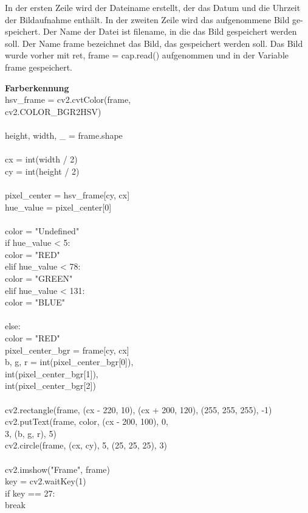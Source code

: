 {In der ersten Zeile wird der Dateiname erstellt, der das Datum und die Uhrzeit der Bildaufnahme enthält. In der zweiten Zeile wird das aufgenommene Bild ge-\\speichert. Der Name der Datei ist \glqq filename\grqq{}, in die das Bild gespeichert werden soll. Der Name \glqq frame\grqq{} bezeichnet das Bild, das gespeichert werden soll. Das Bild wurde vorher mit \glqq ret, frame = cap.read()\grqq{} aufgenommen und in der Variable \glqq frame\grqq{} gespeichert.\\

\newpage

\textbf{Farberkennung}\\

hsv\_frame = cv2.cvtColor(frame,\\ cv2.COLOR\_BGR2HSV)\\
\\
height, width, \_ = frame.shape\\
\\
cx = int(width / 2)\\
cy = int(height / 2)\\
\\
pixel\_center = hsv\_frame[cy, cx]\\
hue\_value = pixel\_center[0]\\
\\
color = "Undefined"\\
if hue\_value < 5:\\
color = "RED"\\
elif hue\_value < 78:\\
color = "GREEN"\\
elif hue\_value < 131:\\
color = "BLUE"\\
\\
else:\\
color = "RED"\\

pixel\_center\_bgr = frame[cy, cx]\\
b, g, r = int(pixel\_center\_bgr[0]),\\ int(pixel\_center\_bgr[1]),\\
int(pixel\_center\_bgr[2])\\
\\
cv2.rectangle(frame, (cx - 220, 10), (cx + 200, 120),
(255, 255, 255), -1)\\
cv2.putText(frame, color, (cx - 200, 100), 0,\\ 3, (b, g, r), 5)\\
cv2.circle(frame, (cx, cy), 5, (25, 25, 25), 3)\\
\\
cv2.imshow("Frame", frame)\\
key = cv2.waitKey(1)\\
if key == 27:\\
break\\


}
